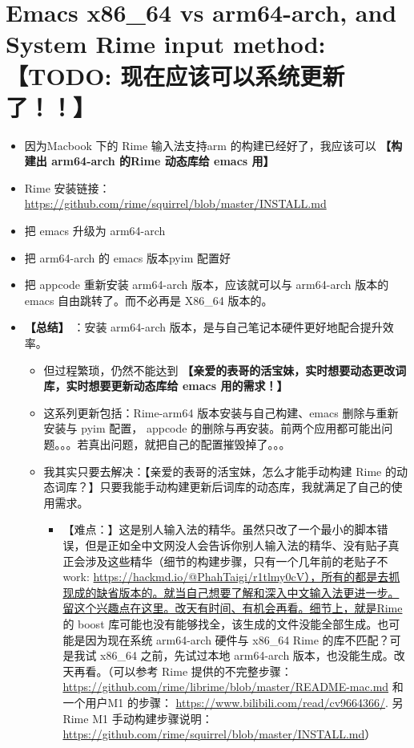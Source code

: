 \documentclass[9pt, b5paper]{article}
\begin{document}
\section{Emacs x86\_64 vs arm64-arch, and System Rime input method: \textbf{【TODO: 现在应该可以系统更新了！！】}}
\label{sec-2}
\begin{itemize}
\item 因为Macbook 下的 Rime 输入法支持arm 的构建已经好了，我应该可以 \textbf{【构建出 arm64-arch 的Rime 动态库给 emacs 用】}
\item Rime 安装链接：\url{https://github.com/rime/squirrel/blob/master/INSTALL.md}
\item 把 emacs 升级为 arm64-arch
\item 把 arm64-arch 的 emacs 版本pyim 配置好
\item 把 appcode 重新安装 arm64-arch 版本，应该就可以与 arm64-arch 版本的 emacs 自由跳转了。而不必再是 X86\_64 版本的。
\item \textbf{【总结】} ：安装 arm64-arch 版本，是与自己笔记本硬件更好地配合提升效率。
\begin{itemize}
\item 但过程繁琐，仍然不能达到 \textbf{【亲爱的表哥的活宝妹，实时想要动态更改词库，实时想要更新动态库给 emacs 用的需求！】}
\item 这系列更新包括：Rime-arm64 版本安装与自己构建、emacs 删除与重新安装与 pyim 配置， appcode 的删除与再安装。前两个应用都可能出问题。。。若真出问题，就把自己的配置摧毁掉了。。。
\item 我其实只要去解决：【亲爱的表哥的活宝妹，怎么才能手动构建 Rime 的动态词库？】只要我能手动构建更新后词库的动态库，我就满足了自己的使用需求。
\begin{itemize}
\item 【难点：】这是别人输入法的精华。虽然只改了一个最小的脚本错误，但是正如全中文网没人会告诉你别人输入法的精华、没有贴子真正会涉及这些精华（细节的构建步骤，只有一个几年前的老贴子不 work: \url{https://hackmd.io/@PhahTaigi/r1tlmy0cV），所有的都是去抓现成的缺省版本的。就当自己想要了解和深入中文输入法更进一步。留这个兴趣点在这里。改天有时间、有机会再看。细节上，就是Rime} 的 boost 库可能也没有能够找全，该生成的文件没能全部生成。也可能是因为现在系统 arm64-arch 硬件与 x86\_64 Rime 的库不匹配？可是我试 x86\_64 之前，先试过本地 arm64-arch 版本，也没能生成。改天再看。（可以参考 Rime 提供的不完整步骤：\url{https://github.com/rime/librime/blob/master/README-mac.md} 和一个用户M1 的步骤： \url{https://www.bilibili.com/read/cv9664366/}. 另Rime M1 手动构建步骤说明：\url{https://github.com/rime/squirrel/blob/master/INSTALL.md}）

\end{itemize}
\end{itemize}
\end{itemize}
\end{document}
